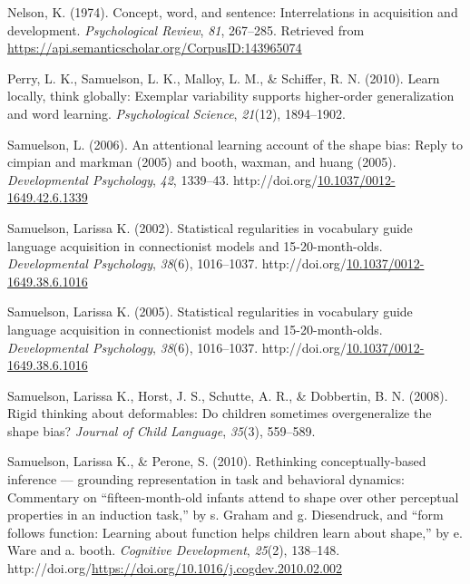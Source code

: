 \documentclass[10pt, letterpaper]{article}
\newenvironment{CSLReferences}%
  {}%
  {\par}
\begin{document}
\begin{CSLReferences}{1}{0}
\leavevmode{}%
Nelson, K. (1974). Concept, word, and sentence: Interrelations in
acquisition and development. \emph{Psychological Review}, \emph{81},
267--285. Retrieved from
\url{https://api.semanticscholar.org/CorpusID:143965074}

\leavevmode{}%
Perry, L. K., Samuelson, L. K., Malloy, L. M., \& Schiffer, R. N.
(2010). Learn locally, think globally: Exemplar variability supports
higher-order generalization and word learning. \emph{Psychological
Science}, \emph{21}(12), 1894--1902.

\leavevmode{}%
Samuelson, L. (2006). An attentional learning account of the shape bias:
Reply to cimpian and markman (2005) and booth, waxman, and huang (2005).
\emph{Developmental Psychology}, \emph{42}, 1339--43.
http://doi.org/\href{https://doi.org/10.1037/0012-1649.42.6.1339}{10.1037/0012-1649.42.6.1339}

\leavevmode{}%
Samuelson, Larissa K. (2002). Statistical regularities in vocabulary
guide language acquisition in connectionist models and 15-20-month-olds.
\emph{Developmental Psychology}, \emph{38}(6), 1016--1037.
http://doi.org/\href{https://doi.org/10.1037/0012-1649.38.6.1016}{10.1037/0012-1649.38.6.1016}

\leavevmode{}%
Samuelson, Larissa K. (2005). Statistical regularities in vocabulary
guide language acquisition in connectionist models and 15-20-month-olds.
\emph{Developmental Psychology}, \emph{38}(6), 1016--1037.
http://doi.org/\href{https://doi.org/10.1037/0012-1649.38.6.1016}{10.1037/0012-1649.38.6.1016}

\leavevmode{}%
Samuelson, Larissa K., Horst, J. S., Schutte, A. R., \& Dobbertin, B. N.
(2008). Rigid thinking about deformables: Do children sometimes
overgeneralize the shape bias? \emph{Journal of Child Language},
\emph{35}(3), 559--589.

\leavevmode{}%
Samuelson, Larissa K., \& Perone, S. (2010). Rethinking
conceptually-based inference --- grounding representation in task and
behavioral dynamics: Commentary on {``fifteen-month-old infants attend
to shape over other perceptual properties in an induction task,''} by s.
Graham and g. Diesendruck, and {``form follows function: Learning about
function helps children learn about shape,''} by e. Ware and a. booth.
\emph{Cognitive Development}, \emph{25}(2), 138--148.
http://doi.org/\url{https://doi.org/10.1016/j.cogdev.2010.02.002}


\end{CSLReferences}
\end{document}
